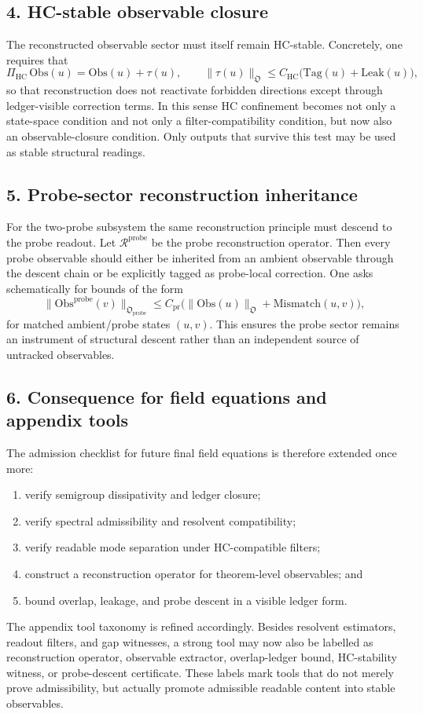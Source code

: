 \documentclass[12pt,a4paper]{article}
\begin{document}
\subsection*{4. HC-stable observable closure}
The reconstructed observable sector must itself remain HC-stable. Concretely, one
requires that
\[
\Pi_{\mathrm{HC}}\,\mathrm{Obs}(u)=\mathrm{Obs}(u)+\tau(u),
\qquad
\|\tau(u)\|_{\mathfrak O}\le C_{\mathrm{HC}}
\bigl(\mathrm{Tag}(u)+\mathrm{Leak}(u)\bigr),
\]
so that reconstruction does not reactivate forbidden directions except through
ledger-visible correction terms. In this sense HC confinement becomes not only a
state-space condition and not only a filter-compatibility condition, but now also an
observable-closure condition. Only outputs that survive this test may be used as
stable structural readings.

\subsection*{5. Probe-sector reconstruction inheritance}
For the two-probe subsystem the same reconstruction principle must descend to the
probe readout. Let $\mathcal R^{\mathrm{probe}}$ be the probe reconstruction operator.
Then every probe observable should either be inherited from an ambient observable
through the descent chain or be explicitly tagged as probe-local correction. One
asks schematically for bounds of the form
\[
\|\mathrm{Obs}^{\mathrm{probe}}(v)\|_{\mathfrak O_{\mathrm{probe}}}
\le C_{\mathrm{pr}}
\bigl(
\|\mathrm{Obs}(u)\|_{\mathfrak O}
+\mathrm{Mismatch}(u,v)
\bigr),
\]
for matched ambient/probe states $(u,v)$. This ensures the probe sector remains an
instrument of structural descent rather than an independent source of untracked
observables.

\subsection*{6. Consequence for field equations and appendix tools}
The admission checklist for future final field equations is therefore extended
once more:
\begin{enumerate}[label=(\arabic*)]
 \item verify semigroup dissipativity and ledger closure;
 \item verify spectral admissibility and resolvent compatibility;
 \item verify readable mode separation under HC-compatible filters;
 \item construct a reconstruction operator for theorem-level observables; and
 \item bound overlap, leakage, and probe descent in a visible ledger form.
\end{enumerate}
The appendix tool taxonomy is refined accordingly. Besides resolvent estimators,
readout filters, and gap witnesses, a strong tool may now also be labelled as
reconstruction operator, observable extractor, overlap-ledger bound, HC-stability
witness, or probe-descent certificate. These labels mark tools that do not merely
prove admissibility, but actually promote admissible readable content into stable
observables.
\end{document}
